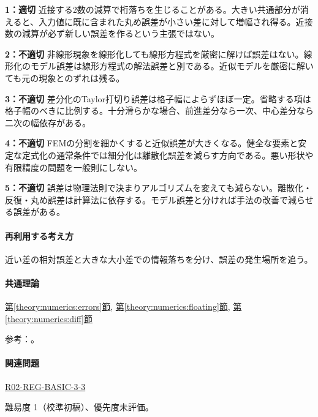 \noindent\textbf{1：適切} 近接する2数の減算で桁落ちを生じることがある。大きい共通部分が消えると、入力値に既に含まれた丸め誤差が小さい差に対して増幅され得る。近接数の減算が必ず新しい誤差を作るという主張ではない。\par

\noindent\textbf{2：不適切} 非線形現象を線形化しても線形方程式を厳密に解けば誤差はない。線形化のモデル誤差は線形方程式の解法誤差と別である。近似モデルを厳密に解いても元の現象とのずれは残る。\par

\noindent\textbf{3：不適切} 差分化のTaylor打切り誤差は格子幅によらずほぼ一定。省略する項は格子幅のべきに比例する。十分滑らかな場合、前進差分なら一次、中心差分なら二次の幅依存がある。\par

\noindent\textbf{4：不適切} FEMの分割を細かくすると近似誤差が大きくなる。健全な要素と安定な定式化の通常条件では細分化は離散化誤差を減らす方向である。悪い形状や有限精度の問題を一般則にしない。\par

\noindent\textbf{5：不適切} 誤差は物理法則で決まりアルゴリズムを変えても減らない。離散化・反復・丸め誤差は計算法に依存する。モデル誤差と分ければ手法の改善で減らせる誤差がある。\par

\paragraph{再利用する考え方} 近い差の相対誤差と大きな大小差での情報落ちを分け、誤差の発生場所を追う。

\paragraph{共通理論} \hyperref[theory:numerics:errors]{第\ref*{theory:numerics:errors}節}, \hyperref[theory:numerics:floating]{第\ref*{theory:numerics:floating}節}, \hyperref[theory:numerics:diff]{第\ref*{theory:numerics:diff}節}

\par 参考：\cite{goldberg1991,nist_differentiation,mit_roy_fea1999}。

\paragraph{関連問題} \hyperref[q:r02-reg-basic-3-3]{R02-REG-BASIC-3-3}

\par 難易度 1（校準初稿）、優先度未評価。

